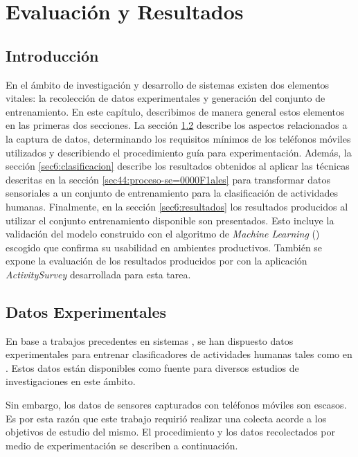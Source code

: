 
\chapter{Evaluación y Resultados}

\label{chap6:evaluacion}

\section{Introducción}

En el ámbito de investigación y desarrollo de sistemas 
existen dos elementos vitales: la recolección de datos experimentales
y generación del conjunto de entrenamiento. En este capítulo, describimos
de manera general estos elementos en las primeras dos secciones. La
sección \ref{sec6:recoleccion} describe los aspectos relacionados
a la captura de datos, determinando los requisitos mínimos de los
teléfonos móviles utilizados y describiendo el procedimiento guía
para experimentación. Además, la sección \ref{sec6:clasificacion}
describe los resultados obtenidos al aplicar las técnicas descritas
en la sección \ref{sec44:proceso-se=0000F1ales} para transformar
datos sensoriales a un conjunto de entrenamiento para la clasificación
de actividades humanas. Finalmente, en la sección \ref{sec6:resultados}
los resultados producidos al utilizar el conjunto entrenamiento disponible
son presentados. Esto incluye la validación del modelo construido
con el algoritmo de \emph{Machine Learning} () escogido
que confirma su usabilidad en ambientes productivos. También se expone
la evaluación de los resultados producidos por \emph{
}con la aplicación \emph{ActivitySurvey} desarrollada para esta tarea.

\section{Datos Experimentales}

\label{sec6:recoleccion}En base a trabajos precedentes en sistemas
, se han dispuesto datos experimentales para entrenar clasificadores
de actividades humanas tales como en \cite{ReyesOrtiz2013}. Estos
datos están disponibles como fuente para diversos estudios de investigaciones
en este ámbito. 

Sin embargo, los datos de sensores capturados con teléfonos móviles
son escasos. Es por esta razón que este trabajo requirió realizar
una colecta acorde a los objetivos de estudio del mismo. El procedimiento
y los datos recolectados por medio de experimentación se describen
a continuación.

